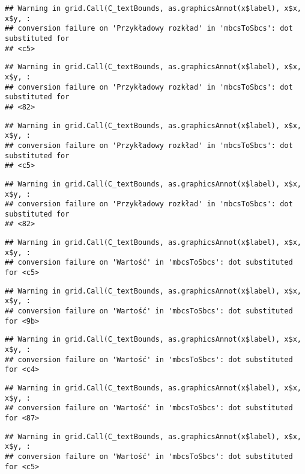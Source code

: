 \documentclass[
]{book}
\begin{document}
\begin{verbatim}
## Warning in grid.Call(C_textBounds, as.graphicsAnnot(x$label), x$x, x$y, :
## conversion failure on 'Przykładowy rozkład' in 'mbcsToSbcs': dot substituted for
## <c5>
\end{verbatim}

\begin{verbatim}
## Warning in grid.Call(C_textBounds, as.graphicsAnnot(x$label), x$x, x$y, :
## conversion failure on 'Przykładowy rozkład' in 'mbcsToSbcs': dot substituted for
## <82>
\end{verbatim}

\begin{verbatim}
## Warning in grid.Call(C_textBounds, as.graphicsAnnot(x$label), x$x, x$y, :
## conversion failure on 'Przykładowy rozkład' in 'mbcsToSbcs': dot substituted for
## <c5>
\end{verbatim}

\begin{verbatim}
## Warning in grid.Call(C_textBounds, as.graphicsAnnot(x$label), x$x, x$y, :
## conversion failure on 'Przykładowy rozkład' in 'mbcsToSbcs': dot substituted for
## <82>
\end{verbatim}

\begin{verbatim}
## Warning in grid.Call(C_textBounds, as.graphicsAnnot(x$label), x$x, x$y, :
## conversion failure on 'Wartość' in 'mbcsToSbcs': dot substituted for <c5>
\end{verbatim}

\begin{verbatim}
## Warning in grid.Call(C_textBounds, as.graphicsAnnot(x$label), x$x, x$y, :
## conversion failure on 'Wartość' in 'mbcsToSbcs': dot substituted for <9b>
\end{verbatim}

\begin{verbatim}
## Warning in grid.Call(C_textBounds, as.graphicsAnnot(x$label), x$x, x$y, :
## conversion failure on 'Wartość' in 'mbcsToSbcs': dot substituted for <c4>
\end{verbatim}

\begin{verbatim}
## Warning in grid.Call(C_textBounds, as.graphicsAnnot(x$label), x$x, x$y, :
## conversion failure on 'Wartość' in 'mbcsToSbcs': dot substituted for <87>
\end{verbatim}

\begin{verbatim}
## Warning in grid.Call(C_textBounds, as.graphicsAnnot(x$label), x$x, x$y, :
## conversion failure on 'Wartość' in 'mbcsToSbcs': dot substituted for <c5>
\end{verbatim}
\end{document}

